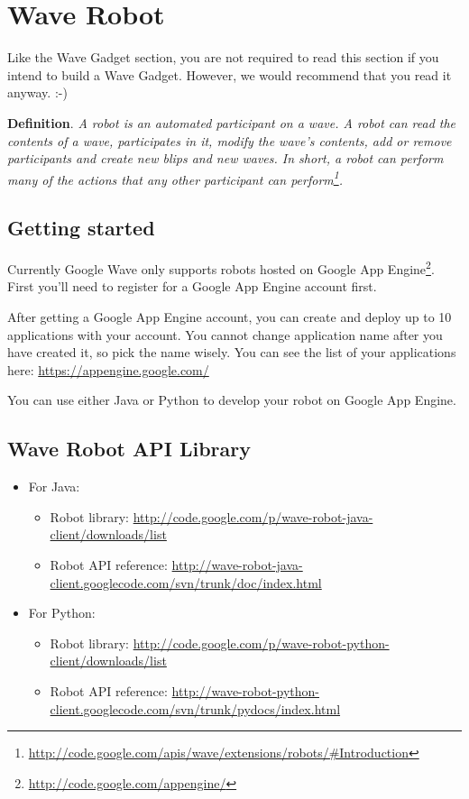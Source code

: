 \section{Wave Robot}

Like the Wave Gadget section, you are not required to read this
section if you intend to build a Wave Gadget. However, we would
recommend that you read it anyway. :-)

{\bf Definition}. {\em A robot is an automated participant on a
wave. A robot can read the contents of a wave, participates in it, modify the wave's contents, add or remove participants
and create new blips and new waves. In short, a robot can perform many
of the actions that any other participant can
perform\footnote{\url{http://code.google.com/apis/wave/extensions/robots/\#Introduction}}.}

\subsection{Getting started}

Currently Google Wave only supports robots hosted on Google App
Engine\footnote{\url{http://code.google.com/appengine/}}.  First
you'll need to register for a Google App Engine account first.

After getting a Google App Engine account, you can create and deploy
up to 10 applications with your account. You cannot change application
name after you have created it, so pick the name wisely. You can see the
list of your applications here:
\url{https://appengine.google.com/}

You can use either Java or Python to develop your robot on Google App
Engine.


\subsection{Wave Robot API Library}

\begin{itemize}
\item For Java:
\begin{itemize} 
\item Robot library: \url{http://code.google.com/p/wave-robot-java-client/downloads/list}
\item Robot API reference: \url{http://wave-robot-java-client.googlecode.com/svn/trunk/doc/index.html}
\end{itemize}
\item For Python: 
\begin{itemize} 
\item Robot library: \url{http://code.google.com/p/wave-robot-python-client/downloads/list}
\item Robot API reference: \url{http://wave-robot-python-client.googlecode.com/svn/trunk/pydocs/index.html}
\end{itemize}
\end{itemize}


